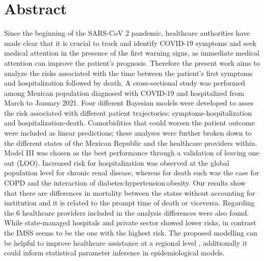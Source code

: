 \documentclass[10pt,letterpaper]{article}
\begin{document}
\section*{Abstract}
Since the beginning of the SARS-CoV 2 pandemic, healthcare authorities
have made clear that it is crucial to track and identify COVID-19
symptoms and seek medical attention in the presence of the first warning
signs, as immediate medical attention can improve the patient's
prognosis. Therefore the present work aims to analyze the risks
associated with the time between the patient's first symptoms and
hospitalization followed by death. A cross-sectional study was performed
among Mexican population diagnosed with COVID-19 and hospitalized from
March to January 2021. Four different Bayesian models were developed to
asses the risk associated with different patient trajectories:
symptoms-hospitalization and hospitalization-death. Comorbidities that
could worsen the patient outcome were included as linear predictions;
these analyses were further broken down to the different states of the
Mexican Republic and the healthcare providers within. Model III was
chosen as the best performance through a validation of leaving one out
(LOO). Increased risk for hospitalization was observed at the global
population level for chronic renal disease, whereas for death such was
the case for COPD and the interaction of diabetes:hypertension:obesity.
Our results show that there are differences in mortality between the
states without accounting for institution and it is related to the
prompt time of death or viceversa. Regarding the 6 healthcare providers
included in the analysis differences were also found. While
state-managed hospitals and private sector showed lower risks, in
contrast the IMSS seems to be the one with the highest risk. The
proposed modelling can be helpful to improve healthcare assistance at a
regional level , additionally it could inform statistical parameter
inference in epidemiological models.


\linenumbers

\newcommand{\N}{\mathbb{N}}
\newcommand{\Z}{\mathbb{Z}}
\newcommand{\R}{\mathbb{R}}
\newcommand{\Q}{\mathbb{Q}}
\newcommand{\vac}{\varnothing}
\newcommand{\Pro}{\mathbb{P}}
\newcommand{\var}{\text{Var}}
\newcommand{\E}{\mathbb{E}}
\end{document}
